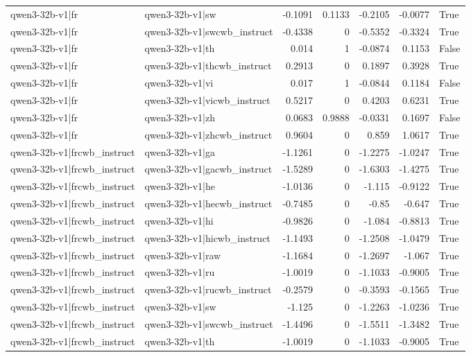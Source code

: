 \begin{table}
\begin{tabular}{l l r r r r l}
qwen3-32b-v1|fr & qwen3-32b-v1|sw & -0.1091 & 0.1133 & -0.2105 & -0.0077 & True \\
qwen3-32b-v1|fr & qwen3-32b-v1|swcwb_instruct & -0.4338 & 0 & -0.5352 & -0.3324 & True \\
qwen3-32b-v1|fr & qwen3-32b-v1|th & 0.014 & 1 & -0.0874 & 0.1153 & False \\
qwen3-32b-v1|fr & qwen3-32b-v1|thcwb_instruct & 0.2913 & 0 & 0.1897 & 0.3928 & True \\
qwen3-32b-v1|fr & qwen3-32b-v1|vi & 0.017 & 1 & -0.0844 & 0.1184 & False \\
qwen3-32b-v1|fr & qwen3-32b-v1|vicwb_instruct & 0.5217 & 0 & 0.4203 & 0.6231 & True \\
qwen3-32b-v1|fr & qwen3-32b-v1|zh & 0.0683 & 0.9888 & -0.0331 & 0.1697 & False \\
qwen3-32b-v1|fr & qwen3-32b-v1|zhcwb_instruct & 0.9604 & 0 & 0.859 & 1.0617 & True \\
qwen3-32b-v1|frcwb_instruct & qwen3-32b-v1|ga & -1.1261 & 0 & -1.2275 & -1.0247 & True \\
qwen3-32b-v1|frcwb_instruct & qwen3-32b-v1|gacwb_instruct & -1.5289 & 0 & -1.6303 & -1.4275 & True \\
qwen3-32b-v1|frcwb_instruct & qwen3-32b-v1|he & -1.0136 & 0 & -1.115 & -0.9122 & True \\
qwen3-32b-v1|frcwb_instruct & qwen3-32b-v1|hecwb_instruct & -0.7485 & 0 & -0.85 & -0.647 & True \\
qwen3-32b-v1|frcwb_instruct & qwen3-32b-v1|hi & -0.9826 & 0 & -1.084 & -0.8813 & True \\
qwen3-32b-v1|frcwb_instruct & qwen3-32b-v1|hicwb_instruct & -1.1493 & 0 & -1.2508 & -1.0479 & True \\
qwen3-32b-v1|frcwb_instruct & qwen3-32b-v1|raw & -1.1684 & 0 & -1.2697 & -1.067 & True \\
qwen3-32b-v1|frcwb_instruct & qwen3-32b-v1|ru & -1.0019 & 0 & -1.1033 & -0.9005 & True \\
qwen3-32b-v1|frcwb_instruct & qwen3-32b-v1|rucwb_instruct & -0.2579 & 0 & -0.3593 & -0.1565 & True \\
qwen3-32b-v1|frcwb_instruct & qwen3-32b-v1|sw & -1.125 & 0 & -1.2263 & -1.0236 & True \\
qwen3-32b-v1|frcwb_instruct & qwen3-32b-v1|swcwb_instruct & -1.4496 & 0 & -1.5511 & -1.3482 & True \\
qwen3-32b-v1|frcwb_instruct & qwen3-32b-v1|th & -1.0019 & 0 & -1.1033 & -0.9005 & True \\

\end{tabular}
\end{table}
